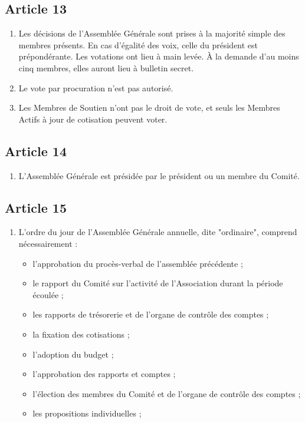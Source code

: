 \documentclass[12pt,twoside]{report}
\begin{document}
\subsection*{Article 13}
\begin{enumerate}
\item Les décisions de l’Assemblée Générale sont prises à la majorité simple des membres présents. En cas d’égalité des voix, celle du président est prépondérante.
Les votations ont lieu à main levée. À la demande d’au moins cinq membres, elles auront lieu à bulletin secret.

\item Le vote par procuration n'est pas autorisé.

\item Les Membres de Soutien n’ont pas le droit de vote, et seuls les Membres Actifs à jour de cotisation peuvent voter.
\end{enumerate}

\subsection*{Article 14}
\begin{enumerate}
\item L’Assemblée Générale est présidée par le président ou un membre du Comité.
\end{enumerate}


\subsection*{Article 15}
\begin{enumerate}
\item L’ordre du jour de l’Assemblée Générale annuelle, dite "ordinaire", comprend nécessairement :
\begin{itemize}
\item l’approbation du procès-verbal de l’assemblée précédente ;
\item le rapport du Comité sur l’activité de l’Association durant la période écoulée ;
\item les rapports de trésorerie et de l’organe de contrôle des comptes ;
\item la fixation des cotisations ;
\item l’adoption du budget ;
\item l’approbation des rapports et comptes ;
\item l’élection des membres du Comité et de l’organe de contrôle des comptes ;
\item les propositions individuelles ;
\end{itemize}
\end{enumerate}
\end{document}
